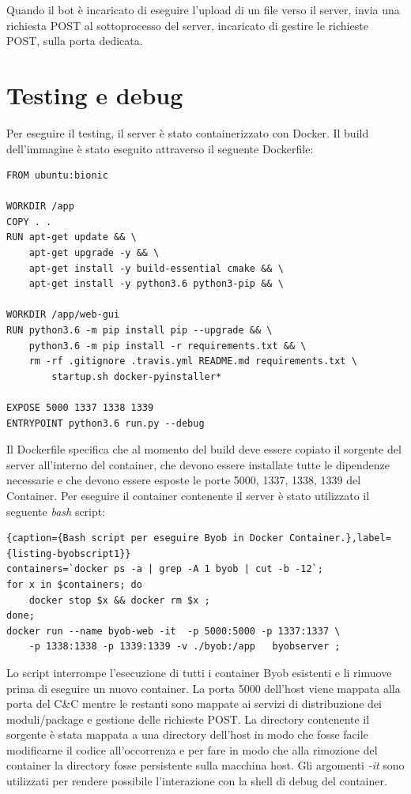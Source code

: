 Quando il bot è incaricato di eseguire l'upload di un file verso il server, invia una richiesta POST al sottoprocesso del server, incaricato di gestire le richieste POST, sulla porta dedicata.

\section{Testing e debug}
Per eseguire il testing, il server è stato containerizzato con Docker.
Il build dell'immagine è stato eseguito attraverso il seguente Dockerfile:
\lstset{  basicstyle=\footnotesize,
frame=single}
\begin{lstlisting}[caption={Byob server Dockerfile.},label={listing-byobdocker},frame=single]
FROM ubuntu:bionic

WORKDIR /app
COPY . .
RUN apt-get update && \
    apt-get upgrade -y && \
    apt-get install -y build-essential cmake && \
    apt-get install -y python3.6 python3-pip && \

WORKDIR /app/web-gui
RUN python3.6 -m pip install pip --upgrade && \
    python3.6 -m pip install -r requirements.txt && \
    rm -rf .gitignore .travis.yml README.md requirements.txt \
        startup.sh docker-pyinstaller*

EXPOSE 5000 1337 1338 1339
ENTRYPOINT python3.6 run.py --debug
\end{lstlisting}
Il Dockerfile specifica che al momento del build deve essere copiato il sorgente del server all'interno del container, che devono essere installate tutte le dipendenze necessarie e che devono essere esposte le porte 5000, 1337, 1338, 1339 del Container.
Per eseguire  il container contenente il server è stato utilizzato  il seguente \textit{bash} script:
\begin{lstlisting}{caption={Bash script per eseguire Byob in Docker Container.},label={listing-byobscript1}}
containers=`docker ps -a | grep -A 1 byob | cut -b -12`;
for x in $containers; do 
    docker stop $x && docker rm $x ;
done;
docker run --name byob-web -it  -p 5000:5000 -p 1337:1337 \
    -p 1338:1338 -p 1339:1339 -v ./byob:/app   byobserver ;
\end{lstlisting}
Lo script interrompe l'esecuzione di tutti i container Byob esistenti e li rimuove prima di eseguire un nuovo container. La porta 5000 dell'host viene mappata alla porta del C\&C  mentre le restanti sono mappate ai servizi di distribuzione dei moduli/package e    gestione delle richieste POST. La directory contenente il sorgente è stata mappata a una directory dell'host in modo che fosse facile modificarne il codice all'occorrenza e per fare in modo che alla rimozione del container la directory fosse persistente sulla macchina host. Gli argomenti \textit{-it} sono utilizzati per rendere possibile l'interazione con la shell di debug del container.

